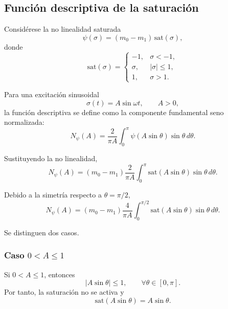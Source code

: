 \documentclass[journal]{IEEEtran}
\begin{document}
\subsection{Función descriptiva de la saturación}

Considérese la no linealidad saturada
\begin{equation}
\label{eq:psi_ns_def_appendix}
\psi(\sigma)=
(m_0-m_1)\,\mathrm{sat}(\sigma),
\end{equation}
donde
\begin{equation}
\mathrm{sat}(\sigma)=
\begin{cases}
-1, & \sigma<-1,\\
\sigma, & |\sigma|\leq 1,\\
1, & \sigma>1.
\end{cases}
\end{equation}

Para una excitación sinusoidal
\begin{equation}
\label{eq:sigma_input_appendix}
\sigma(t)=A\sin\omega t,
\qquad
A>0,
\end{equation}
la función descriptiva se define como la componente fundamental seno normalizada:
\begin{equation}
\label{eq:Npsi_def_appendix}
N_\psi(A)
=
\frac{2}{\pi A}
\int_0^\pi
\psi(A\sin\theta)\sin\theta\,d\theta.
\end{equation}

Sustituyendo la no linealidad,
\begin{equation}
N_\psi(A)
=
(m_0-m_1)
\frac{2}{\pi A}
\int_0^\pi
\mathrm{sat}(A\sin\theta)\sin\theta\,d\theta.
\end{equation}

Debido a la simetría respecto a $\theta=\pi/2$,
\begin{equation}
\label{eq:symmetry_appendix}
N_\psi(A)
=
(m_0-m_1)
\frac{4}{\pi A}
\int_0^{\pi/2}
\mathrm{sat}(A\sin\theta)\sin\theta\,d\theta.
\end{equation}

Se distinguen dos casos.

\subsubsection*{Caso \(0<A\leq 1\)}

Si \(0<A\leq 1\), entonces
\[
|A\sin\theta|\leq 1,
\qquad
\forall \theta\in[0,\pi].
\]
Por tanto, la saturación no se activa y
\begin{equation}
\mathrm{sat}(A\sin\theta)=A\sin\theta.
\end{equation}
\end{document}
